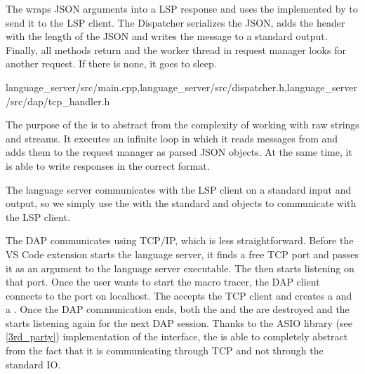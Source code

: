 The  wraps JSON arguments into a LSP response and uses the  implemented by  to send it to the LSP client. The Dispatcher serializes the JSON, adds the header with the length of the JSON and writes the message to a standard output. Finally, all methods return and the worker thread in request manager looks for another request. If there is none, it goes to sleep.

{language\_server/src/main.cpp,language\_server/src/dispatcher.h,language\_server/src/dap/tcp\_handler.h}

The purpose of the  is to abstract from the complexity of working with raw strings and streams. It executes an infinite loop in which it reads messages from  and adds them to the request manager as parsed JSON objects. At the same time, it is able to write responses in the correct format.

The language server communicates with the LSP client on a standard input and output, so we simply use the  with the standard  and  objects to communicate with the LSP client.

The DAP communicates using TCP/IP, which is less straightforward. Before the VS Code extension starts the language server, it finds a free TCP port and passes it as an argument to the language server executable. The  then starts listening on that port. Once the user wants to start the macro tracer, the DAP client connects to the port on localhost. The  accepts the TCP client and creates a  and a . Once the DAP communication ends, both the  and the  are destroyed and the  starts listening again for the next DAP session. Thanks to the ASIO library (see \cref{3rd_party}) implementation of the  interface, the  is able to completely abstract from the fact that it is communicating through TCP and not through the standard IO.

